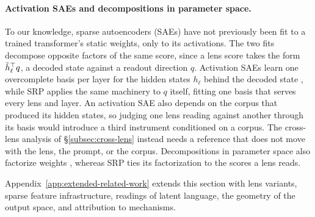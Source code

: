 \paragraph{Activation SAEs and decompositions in parameter space.}
To our knowledge, sparse autoencoders (SAEs) have not previously been
fit to a trained transformer's static weights, only to its activations.
The two fits decompose opposite factors of the same score, since a lens
score takes the form \(\tilde h_\ell^\top q\), a decoded state against a
readout direction \(q\). Activation SAEs learn one overcomplete basis
per layer for the hidden states \(h_\ell\) behind the decoded state
\citep{bricken2023monosemanticity,cunningham2023sparse,gao2024scaling,templeton2024scaling},
while SRP applies the same machinery to \(q\) itself, fitting one
basis that serves every lens and layer.
An activation SAE also depends
on the corpus that produced its hidden states, so judging one lens
reading against another through its basis would introduce a third
instrument conditioned on a corpus. The cross-lens analysis of
\S\ref{subsec:cross-lens} instead needs a reference that does not move
with the lens, the prompt, or the corpus.
Decompositions in parameter space also factorize weights
\citep{braun2025parameter,gao2025weightsparse}, whereas SRP ties its
factorization to the scores a lens reads.

Appendix~\ref{app:extended-related-work} extends this section with lens
variants, sparse feature infrastructure, readings of latent language, the
geometry of the output space, and attribution to mechanisms.
